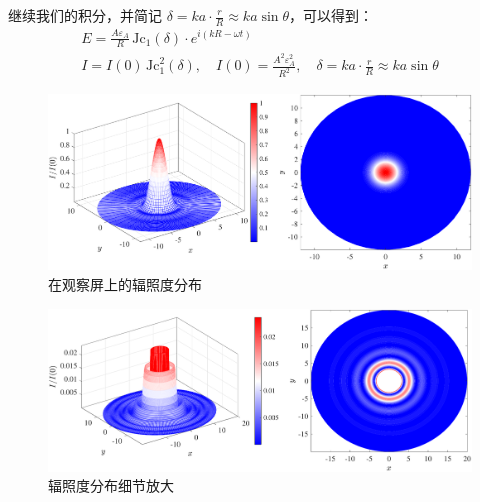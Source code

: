 \documentclass[UTF8]{report}
\def\Jc{\mathrm{\,Jc}}
\theoremstyle{MyLineTheoremStyle} %
\theoremstyle{MyBlockTheoremStyle} %
\theoremstyle{MySubsubsectionStyle} %
\begin{document}
继续我们的积分，并简记 $\delta = ka \cdot \frac{r}{R} \approx ka \sin \theta $，可以得到：
\begin{gather}
E = \frac{A\varepsilon_A}{R} \Jc_1(\delta) \cdot e^{i(kR - \omega t)} \\ 
I = I(0) \Jc_1^2(\delta),\quad I(0) = \frac{A^2\varepsilon_A^2}{R^2},\quad 
\delta =  ka \cdot \frac{r}{R} \approx ka \sin \theta 
\end{gather}
\vspace*{-6mm}
\begin{figure}[H]\centering
    \includegraphics[width=0.9\columnwidth]{assets/4/4.3 小孔辐照度分布 1.pdf}
    \vspace*{-5mm}
    \caption{在观察屏上的辐照度分布}
\end{figure}
\begin{figure}[H]\centering
    \includegraphics[width=0.93\columnwidth]{assets/4/4.3 小孔辐照度分布 2.pdf}\vspace*{-5mm}
    \caption{辐照度分布细节放大}
\end{figure}
\end{document}
